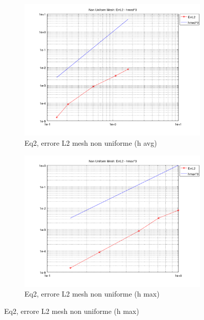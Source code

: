 \documentclass[12pt,a4paper]{report}
\theoremstyle{theorem}
\theoremstyle{theorem}
\theoremstyle{definition}
\begin{document}
\begin{figure}[!h]
	\centering
	\begin{subfigure}[b]{0.49\textwidth}
    		\includegraphics[width=\textwidth]{Eq2-L2avg.png}
    		\caption{Eq2, errore L2 mesh non uniforme (h avg)}

    	\end{subfigure}
    	\begin{subfigure}[b]{0.49\textwidth}
    		\includegraphics[width=\textwidth]{Eq2-L2max.png}
   		\caption{Eq2, errore L2 mesh non uniforme (h max)}
    	\end{subfigure}
\end{figure}
\end{document}
